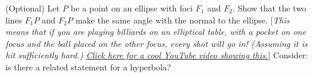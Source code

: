 \documentclass[answers]{exam}
\begin{document}
\begin{questions}
\question%
(Optional) Let $P$ be a point on an ellipse with foci $F_{1}$ and $F_{2}$. Show that the two lines $F_{1} P$ and $F_{2} P$ make the same angle with the normal to the ellipse. [\emph{This means that if you are playing billiards on an elliptical table, with a pocket on one focus and the ball placed on the other focus, every shot will go in! (Assuming it is hit sufficiently hard.) \href{https://www.youtube.com/watch?v=4KHCuXN2F3I}{Click here for a cool YouTube video showing this.}}] Consider: is there a related statement for a hyperbola?

\end{questions}
\end{document}
